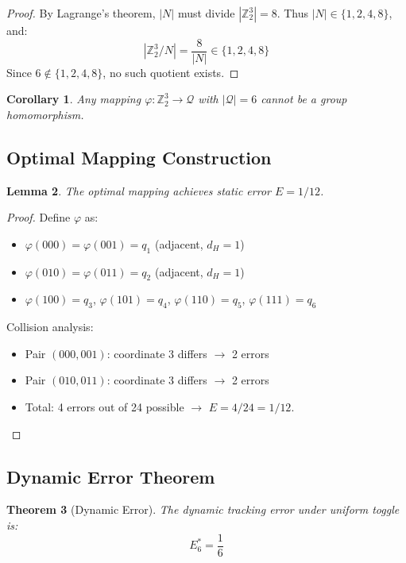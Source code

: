 \documentclass[11pt]{article}
\newtheorem{theorem}{Theorem}[section]
\newtheorem{lemma}[theorem]{Lemma}
\newtheorem{corollary}[theorem]{Corollary}
\begin{document}
\begin{proof}
By Lagrange's theorem, $|N|$ must divide $|\mathbb{Z}_2^3| = 8$. Thus $|N| \in \{1, 2, 4, 8\}$, and:
$$|\mathbb{Z}_2^3 / N| = \frac{8}{|N|} \in \{1, 2, 4, 8\}$$
Since $6 \notin \{1, 2, 4, 8\}$, no such quotient exists.
\end{proof}

\begin{corollary}
\label{cor:homomorphism}
Any mapping $\varphi: \mathbb{Z}_2^3 \to \mathcal{Q}$ with $|\mathcal{Q}| = 6$ cannot be a group homomorphism.
\end{corollary}

\subsection{Optimal Mapping Construction}

\begin{lemma}
\label{lem:optimal}
The optimal mapping achieves static error $E = 1/12$.
\end{lemma}

\begin{proof}
Define $\varphi$ as:
\begin{itemize}
    \item $\varphi(000) = \varphi(001) = q_1$ (adjacent, $d_H = 1$)
    \item $\varphi(010) = \varphi(011) = q_2$ (adjacent, $d_H = 1$)
    \item $\varphi(100) = q_3$, $\varphi(101) = q_4$, $\varphi(110) = q_5$, $\varphi(111) = q_6$
\end{itemize}

Collision analysis:
\begin{itemize}
    \item Pair $(000, 001)$: coordinate 3 differs $\to$ 2 errors
    \item Pair $(010, 011)$: coordinate 3 differs $\to$ 2 errors
    \item Total: 4 errors out of 24 possible $\to$ $E = 4/24 = 1/12$.
\end{itemize}
\end{proof}

\subsection{Dynamic Error Theorem}

\begin{theorem}[Dynamic Error]
\label{thm:dynamic}
The dynamic tracking error under uniform toggle is:
$$\boxed{E_6^* = \frac{1}{6}}$$
\end{theorem}
\end{document}
